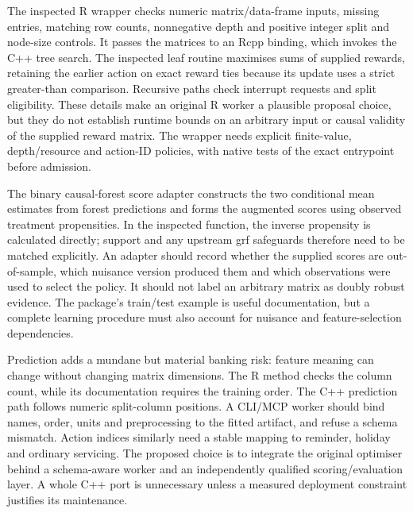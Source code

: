 The inspected R wrapper checks numeric matrix/data-frame inputs, missing entries,
matching row counts, nonnegative depth and positive integer split and node-size
controls. It passes the matrices to an Rcpp binding, which invokes the C++ tree
search. The inspected leaf routine maximises sums of supplied rewards, retaining
the earlier action on exact reward ties because its update uses a strict greater-than
comparison. Recursive paths check interrupt requests and split eligibility. These
details make an original R worker a plausible proposal choice, but they do not
establish runtime bounds on an arbitrary input or causal validity of the supplied
reward matrix. The wrapper needs explicit finite-value, depth/resource and action-ID
policies, with native tests of the exact entrypoint before admission.
\citep{exec24_policiesr_policytree}

The binary causal-forest score adapter constructs the two conditional mean estimates
from forest predictions and forms the augmented scores using observed treatment
propensities. In the inspected function, the inverse propensity is calculated
directly; support and any upstream grf safeguards therefore need to be matched
explicitly. An adapter should record whether the supplied scores are out-of-sample,
which nuisance version produced them and which observations were used to select
the policy. It should not label an arbitrary matrix as doubly robust evidence.
The package's train/test example is useful documentation, but a complete learning
procedure must also account for nuisance and feature-selection dependencies.
\citep{exec24_policiesr_policytree}

Prediction adds a mundane but material banking risk: feature meaning can change
without changing matrix dimensions. The R method checks the column count, while
its documentation requires the training order. The C++ prediction path follows
numeric split-column positions. A CLI/MCP worker should bind names, order, units
and preprocessing to the fitted artifact, and refuse a schema mismatch. Action
indices similarly need a stable mapping to reminder, holiday and ordinary servicing.
The proposed choice is to integrate the original optimiser behind a schema-aware
worker and an independently qualified scoring/evaluation layer. A whole C++ port
is unnecessary unless a measured deployment constraint justifies its maintenance.
\citep{exec24_policiesr_policytree}

